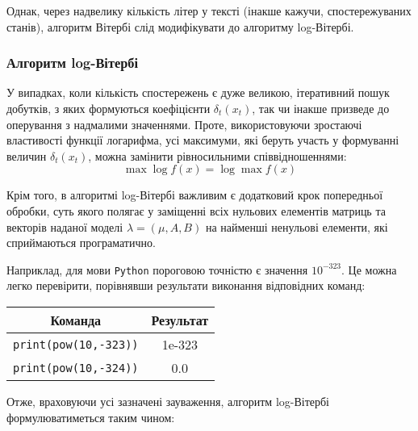 Однак, через надвелику кількість літер у тексті (інакше кажучи, спостережуваних станів), алгоритм Вітербі слід модифікувати до алгоритму log-Вітербі.

\subsubsection{Алгоритм log-Вітербі}

У випадках, коли кількість спостережень є дуже великою, ітеративний пошук добутків, з яких формуються коефіцієнти $\delta_t(x_t)$, так чи інакше призведе до оперування з надмалими значеннями. Проте, використовуючи зростаючі властивості функції логарифма, усі максимуми, які беруть участь у формуванні величин $\delta_t(x_t)$, можна замінити рівносильними співвідношеннями: 
\[ \max\log f(x)=\log\max f(x) \]

Крім того, в алгоритмі log-Вітербі важливим є додатковий крок попередньої обробки, суть якого полягає у заміщенні всіх нульових елементів матриць та векторів наданої моделі $\lambda=(\mu,A,B)$ на найменші ненульові елементи, які сприймаються програматично. 

Наприклад, для мови \texttt{Python} пороговою точністю є значення $10^{-323}$. Це можна легко перевірити, порівнявши результати виконання відповідних команд:

\vspace{0.4cm}
\begin{table}[H]
    \begin{center}
        \begin{tabular}{||c|c||}
            \hline
            Команда & Результат \\
            \hline 
            \texttt{print(pow(10,-323))} & 1e-323 \\
            \hline 
            \texttt{print(pow(10,-324))} & 0.0 \\
            \hline
        \end{tabular}
    \end{center}
\end{table}

Отже, враховуючи усі зазначені зауваження, алгоритм log-Вітербі формулюватиметься таким чином:

